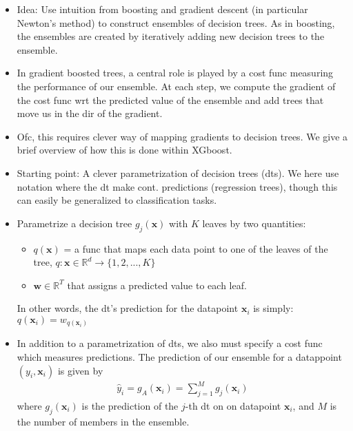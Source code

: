 \documentclass[norsk,a4paper,11pt]{article}
\begin{document}
\begin{itemize}
	\item Idea: Use intuition from boosting and gradient descent (in particular Newton's method) to construct ensembles of decision trees. As in boosting, the ensembles are created by iteratively adding new decision trees to the ensemble.
	\item In gradient boosted trees, a central role is played by a cost func measuring the performance of our ensemble. At each step, we compute the gradient of the cost func wrt the predicted value of the ensemble and add trees that move us in the dir of the gradient.
	\item Ofc, this requires clever way of mapping gradients to decision trees. We give a brief overview of how this is done within XGboost.
	\item Starting point: A clever parametrization of decision trees (dts). We here use notation where the dt make cont. predictions (regression trees), though this can easily be generalized to classification tasks.
	\item Parametrize a decision tree $g_j (\bm{x})$ with $K$ leaves by two quantities:
	\begin{itemize}
		\item $q(\bm{x})$ = a func that maps each data point to one of the leaves of the tree, $q : \bm{x} \in \mathbb{R}^d \rightarrow \{ 1, 2,...,K \}$
		\item $\bm{w} \in \mathbb{R}^T$ that assigns a predicted value to each leaf.
	\end{itemize}
	In other words, the dt's prediction for the datapoint $\bm{x}_i$ is simply:
	$q(\bm{x}_i) = w_{q(\bm{x}_i)}$
	\item In addition to a parametrization of dts, we also must specify a cost func which measures predictions. The prediction of our ensemble for a datappoint $(y_i, \bm{x}_i)$ is given by
	\begin{align}
		\hat{y}_i = g_A (\bm{x}_i) = \sum_{j=1}^M g_j (\bm{x}_i)
	\end{align}
	where $g_j(\bm{x}_i)$ is the prediction of the $j$-th dt on on datapoint $\bm{x}_i$, and $M$ is the number of members in the ensemble. 


\end{itemize}
\end{document}
